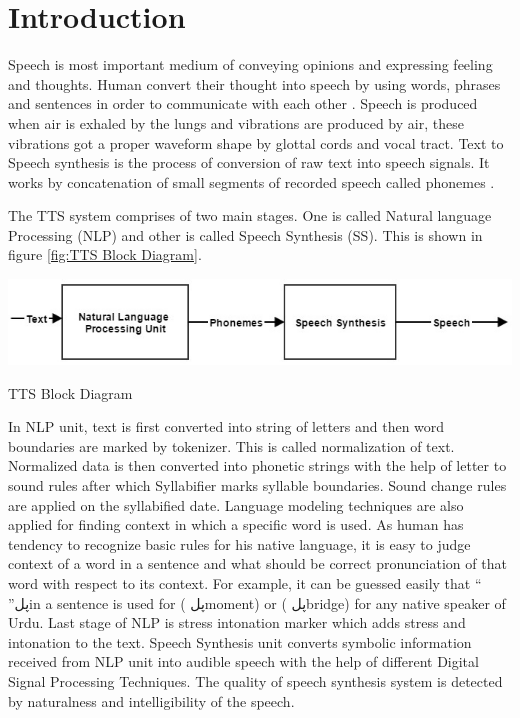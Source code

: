 \chapter{Introduction}

Speech is most important medium of conveying opinions and expressing feeling and thoughts.
Human convert their thought into speech by using words, phrases and sentences in order to communicate with each other \cite{mumtaz2016break}. Speech is produced when air is exhaled by the lungs and vibrations are produced by air, these vibrations got a proper waveform shape by glottal cords and vocal tract. Text to Speech synthesis is the process of conversion of raw text into speech signals. It works by concatenation of small segments of recorded speech called phonemes \cite{khilari2015review}.

The TTS system comprises of two main stages. One is called Natural language Processing (NLP) and
other is called Speech Synthesis (SS). This is shown in figure \ref{fig:TTS Block Diagram}.

\begin{center}
  \includegraphics[width=\linewidth]{images/tts_bd.jpg}
  \caption{TTS Block Diagram}
  \label{fig:TTS Block Diagram}
\end{center}

In NLP unit, text is first converted into string of letters and then word boundaries are marked by
tokenizer. This is called normalization of text. Normalized data is then converted into phonetic strings
with the help of letter to sound rules after which Syllabifier marks syllable boundaries. Sound change
rules are applied on the syllabified date. Language modeling techniques are also applied for finding
context in which a specific word is used. As human has tendency to recognize basic rules for his native
language, it is easy to judge context of a word in a sentence and what should be correct pronunciation of
that word with respect to its context. For example, it can be guessed easily that “ ”پلin a sentence is used
for ( پلmoment) or ( پلbridge) for any native speaker of Urdu. Last stage of NLP is stress intonation
marker which adds stress and intonation to the text. Speech Synthesis unit converts symbolic information
received from NLP unit into audible speech with the help of different Digital Signal Processing
Techniques. The quality of speech synthesis system is detected by naturalness and intelligibility of the speech.

